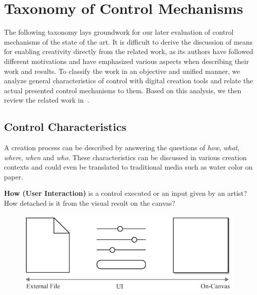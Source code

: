 

\section{Taxonomy of Control Mechanisms}\label{sec:taxo_control_mechanism}

The following taxonomy lays groundwork for our later evaluation of control mechanisms of the state of the art. It is difficult to derive the discussion of means for enabling creativity directly from the related work, as its authors have followed different motivations and have emphasized various aspects when describing their work and results. To classify the work in an objective and unified manner, we analyze general characteristics of control with digital creation tools and relate the actual presented control mechanisms to them. Based on this analysis, we then review the related work in~.

\newcommand{\controlParamsFigWidth}{0.9}

\subsection{Control Characteristics}\label{control_charateristics}
A creation process can be described by answering the questions of \textit{how}, \textit{what}, \textit{where}, \textit{when} and \textit{who}. These characteristics can be discussed in various creation contexts and could even be translated to traditional media such as water color on paper.

\noindent\textbf{How (User Interaction)} is a control executed or an input given by an artist? How detached is it from the visual result on the canvas? 

\begin{figure}[H]
    \centering
        \includegraphics[width=\controlParamsFigWidth\linewidth]{figures/control_paradigms/how.pdf}
\end{figure}

